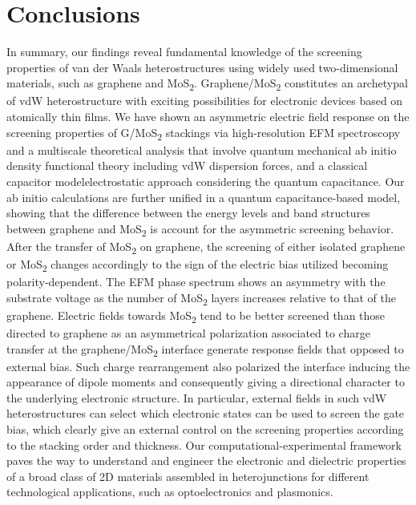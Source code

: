 \section{Conclusions}
\label{sec:asym-conclusions}


In summary, our findings reveal fundamental knowledge of the screening
properties of van der Waals heterostructures using widely used
two-dimensional materials, such as graphene and MoS\textsubscript{2}. Graphene/MoS\textsubscript{2}
constitutes an archetypal of vdW heterostructure with exciting
possibilities for electronic devices based on atomically thin films.
We have shown an asymmetric electric field response on the screening
properties of G/MoS\textsubscript{2} stackings via high-resolution EFM spectroscopy
and a multiscale theoretical analysis that involve quantum mechanical
ab initio density functional theory including vdW dispersion forces,
and a classical capacitor modelelectrostatic approach considering the
quantum capacitance.  Our ab initio calculations are further unified
in a quantum capacitance-based model, showing that the difference
between the energy levels and band structures between graphene and
MoS\textsubscript{2} is account for the asymmetric screening behavior. After the
transfer of MoS\textsubscript{2} on graphene, the screening of either isolated
graphene or MoS\textsubscript{2} changes accordingly to the sign of the electric bias
utilized becoming polarity-dependent. The EFM phase spectrum shows an
asymmetry with the substrate voltage as the number of MoS\textsubscript{2} layers
increases relative to that of the graphene. Electric fields towards
MoS\textsubscript{2} tend to be better screened than those directed to graphene as an
asymmetrical polarization associated to charge transfer at the
graphene/MoS\textsubscript{2} interface generate response fields that opposed to
external bias. Such charge rearrangement also polarized the interface
inducing the appearance of dipole moments and consequently giving a
directional character to the underlying electronic structure. In
particular, external fields in such vdW heterostructures can select
which electronic states can be used to screen the gate bias, which
clearly give an external control on the screening properties according
to the stacking order and thickness. Our computational-experimental
framework paves the way to understand and engineer the electronic and
dielectric properties of a broad class of 2D materials assembled in
heterojunctions for different technological applications, such as
optoelectronics and plasmonics.


